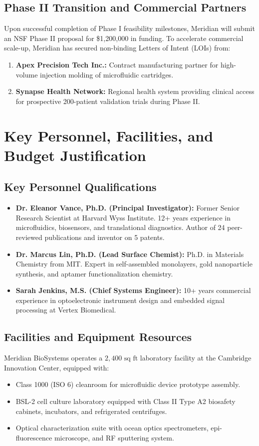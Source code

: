 \documentclass[11pt,a4paper]{scrartcl}
\begin{document}
\subsection{Phase II Transition and Commercial Partners}
Upon successful completion of Phase I feasibility milestones, Meridian will submit an NSF Phase II proposal for \$1,200,000 in funding. To accelerate commercial scale-up, Meridian has secured non-binding Letters of Intent (LOIs) from:
\begin{enumerate}
    \item \textbf{Apex Precision Tech Inc.:} Contract manufacturing partner for high-volume injection molding of microfluidic cartridges.
    \item \textbf{Synapse Health Network:} Regional health system providing clinical access for prospective 200-patient validation trials during Phase II.
\end{enumerate}

\section{Key Personnel, Facilities, and Budget Justification}

\subsection{Key Personnel Qualifications}
\begin{itemize}
    \item \textbf{Dr. Eleanor Vance, Ph.D. (Principal Investigator):} Former Senior Research Scientist at Harvard Wyss Institute. 12+ years experience in microfluidics, biosensors, and translational diagnostics. Author of 24 peer-reviewed publications and inventor on 5 patents.
    \item \textbf{Dr. Marcus Lin, Ph.D. (Lead Surface Chemist):} Ph.D. in Materials Chemistry from MIT. Expert in self-assembled monolayers, gold nanoparticle synthesis, and aptamer functionalization chemistry.
    \item \textbf{Sarah Jenkins, M.S. (Chief Systems Engineer):} 10+ years commercial experience in optoelectronic instrument design and embedded signal processing at Vertex Biomedical.
\end{itemize}

\subsection{Facilities and Equipment Resources}
Meridian BioSystems operates a $2,400\text{ sq ft}$ laboratory facility at the Cambridge Innovation Center, equipped with:
\begin{itemize}
    \item Class 1000 (ISO 6) cleanroom for microfluidic device prototype assembly.
    \item BSL-2 cell culture laboratory equipped with Class II Type A2 biosafety cabinets, incubators, and refrigerated centrifuges.
    \item Optical characterization suite with ocean optics spectrometers, epi-fluorescence microscope, and RF sputtering system.
\end{itemize}
\end{document}
